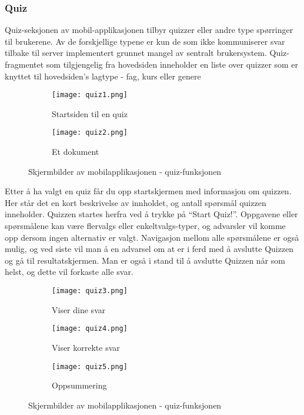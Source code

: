 \documentclass[../main.tex]{subfiles}
\begin{document}
\newpage

\subsubsection{Quiz}

Quiz-seksjonen av mobil-applikasjonen tilbyr quizzer eller andre type spørringer til brukerene. Av de forskjellige typene er kun de som ikke kommuniserer svar tilbake til server implementert grunnet mangel av sentralt brukersystem.
Quiz-fragmentet som tilgjengelig fra hovedsiden inneholder en liste over quizzer som er knyttet til hovedsiden’s lagtype - fag, kurs eller genere

\begin{figure}[H]
        \centering
        \begin{subfigure}[b]{0.4\textwidth}
                \centering
                \texttt{[image: quiz1.png]}
                \caption{Startsiden til en quiz}
        \end{subfigure}
        \quad
        \begin{subfigure}[b]{0.4\textwidth}
                \centering
                \texttt{[image: quiz2.png]}
                \caption{Et dokument}
        \end{subfigure}
        \caption{Skjermbilder av mobilapplikasjonen - quiz-funksjonen}
\end{figure}

Etter å ha valgt en quiz får du opp startskjermen med informasjon om quizzen. Her står det en kort beskrivelse av innholdet, og antall spørsmål quizzen inneholder. Quizzen startes herfra ved å trykke på “Start Quiz!”.
Oppgavene eller spørsmålene kan være flervalgs eller enkeltvalgs-typer, og advarsler vil komme opp dersom ingen alternativ er valgt. Navigasjon mellom alle spørsmålene er også mulig, og ved siste vil man å en advarsel om at er i ferd med å avslutte Quizzen og gå til resultatskjermen. Man er også i stand til å avslutte Quizzen når som helst, og dette vil forkaste alle svar.

\begin{figure}[H]
        \centering
        \begin{subfigure}[b]{0.3\textwidth}
                \centering
                \texttt{[image: quiz3.png]}
                \caption{Viser dine svar}
        \end{subfigure}
        \quad
        \begin{subfigure}[b]{0.3\textwidth}
                \centering
                \texttt{[image: quiz4.png]}
                \caption{Viser korrekte svar}
        \end{subfigure}
        \quad
                \begin{subfigure}[b]{0.3\textwidth}
                        \centering
                        \texttt{[image: quiz5.png]}
                        \caption{Oppsummering}
                \end{subfigure}
        \caption{Skjermbilder av mobilapplikasjonen - quiz-funksjonen}
\end{figure}
\end{document}
